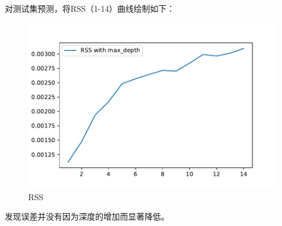 \documentclass[UTF8,a4paper,AutoFakeBold,AutoFakeSlant]{article}
\begin{document}
对测试集预测，将RSS（1-14）曲线绘制如下：
\begin{figure}[H]
  \centering
  \includegraphics[scale=0.675]{boosting_treerss.pdf}
  \caption{RSS}
  \label{f4}
\end{figure}
发现误差并没有因为深度的增加而显著降低。





















% 
% 
% 
\end{document}
